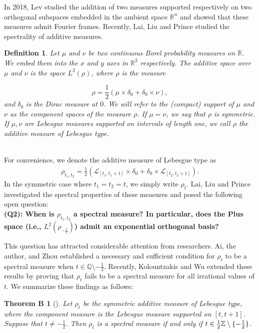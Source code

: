 \documentclass[12pt,psfig,reqno]{amsart}
\numberwithin{equation}{section}
\theoremstyle{plain}
\newtheorem*{thmB}{Theorem B}
\newtheorem{de}[thm]{Definition}
\begin{document}
In 2018, Lev \cite{Lev18} studied the addition of two
measures supported respectively on two orthogonal subspaces embedded in the ambient
space $\mathbb R^n$  and showed that these measures admit Fourier frames. Recently, Lai, Liu and Prince \cite{LLP21} studied the spectrality of additive measures. 
\begin{de}
	Let $\mu$ and $\nu$ be two continuous Borel probability measures on $\mathbb{R}$. We embed them into the $x$ and $y$ axes in $\mathbb{R}^{2}$ respectively. The \emph{additive space over $\mu$ and $\nu$} is the space $L^{2}(\rho)$, where $\rho$ is the measure
	
	\[
	\rho=\frac{1}{2}(\mu\times\delta_{0}+\delta_{0}\times\nu),
	\] 
	and $\delta_{0}$ is the Dirac measure at $0$. We will refer to the (compact) support of $\mu$ and $\nu$ as the \emph{component spaces} of the measure $\rho$. If $\mu=\nu$, we say that $\rho$ is \emph{symmetric}. 
	If $\mu,\nu$ are Lebesgue measures supported on intervals of length one, we call $\rho$ the \emph{additive measure
		 of Lebesgue type}. 
\end{de}
\noindent
\\
For convenience, we denote the additive measure of Lebesgue type as
\begin{align}\label{(1.2)}
	\rho_{t_1,t_2}=\frac{1}{2}(\mathcal{L}_{[t_1,t_1+1]}\times\delta_0+\delta_0\times\mathcal{L}_{[t_2,t_2+1]}).
\end{align}
In the symmetric case where $t_1 = t_2 = t$, we simply write $\rho_t$. 
Lai, Liu and Prince \cite{LLP21} investigated the spectral properties of these measures and posed the following open question:
\\
 \textbf{(Q2): When is \(\rho_{t_1,t_2}\) a spectral measure? In particular, does the  Plus space (i.e., $L^2(\rho_{-\frac{1}{2}})$) admit an exponential orthogonal basis?}

This question has attracted considerable attention from researchers. Ai, the author, and Zhou established a necessary and sufficient condition for $\rho_t$ to be a spectral measure when $t \in \mathbb{Q}\setminus{-\frac{1}{2}}$. Recently, Kolountzakis and Wu \cite{KW25} extended these results by proving that $\rho_t$ fails to be a spectral measure for all irrational values of $t$. We summarize these findings as follows:
\begin{thmB}[\cite{ALZ23,KW25}]\label{thmb}
	Let $\rho_{t}$ be the symmetric additive measure of Lebesgue type, where the component measure is the Lebesgue measure supported on $[t,t+1]$. 
	Suppose that $t\neq-\frac12$. 
	Then $\rho_{t}$ is a spectral measure if and only if $t\in\frac12\Bbb Z\setminus\{-\frac12\}$. 
\end{thmB}
\end{document}
